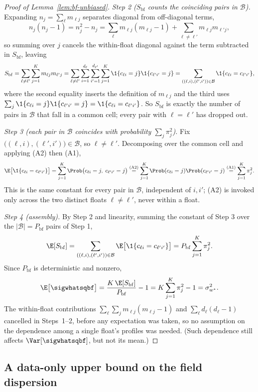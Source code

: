 {\begin{proof}[Proof of Lemma~\ref{lem:bf-unbiased}]
\emph{Step 2 ($S_{\mathrm{bf}}$ counts the coinciding pairs in $\mathcal B$).}
Expanding $n_j=\sum_\ell m_{\ell j}$ separates diagonal from off-diagonal
terms,
\[
  n_j(n_j-1)=n_j^2-n_j
  =\sum_\ell m_{\ell j}(m_{\ell j}-1)+\sum_{\ell\ne\ell'}m_{\ell j}m_{\ell'j},
\]
so summing over $j$ cancels the within-float diagonal against the term
subtracted in $S_{\mathrm{bf}}$, leaving
\[
  S_{\mathrm{bf}}=\sum_{\ell\ne\ell'}\sum_{j=1}^{K}m_{\ell j}m_{\ell'j}
  =\sum_{\ell\ne\ell'}\sum_{i=1}^{d_\ell}\sum_{i'=1}^{d_{\ell'}}
    \sum_{j=1}^{K}\1\{c_{\ell i}=j\}\1\{c_{\ell'i'}=j\}
  =\sum_{((\ell,i),(\ell',i'))\in\mathcal B}\1\{c_{\ell i}=c_{\ell'i'}\},
\]
where the second equality inserts the definition of $m_{\ell j}$ and the
third uses
$\sum_j\1\{c_{\ell i}=j\}\1\{c_{\ell'i'}=j\}=\1\{c_{\ell i}=c_{\ell'i'}\}$. So
$S_{\mathrm{bf}}$ is exactly the number of pairs in $\mathcal B$ that fall
in a common cell; every pair with $\ell=\ell'$ has dropped out.

\emph{Step 3 (each pair in $\mathcal B$ coincides with probability
$\sum_j\pi_j^2$).}
Fix $\bigl((\ell,i),(\ell',i')\bigr)\in\mathcal B$, so $\ell\ne\ell'$.
Decomposing over the common cell and applying (A2) then (A1),
\[
  \E\bigl[\1\{c_{\ell i}=c_{\ell'i'}\}\bigr]
  =\sum_{j=1}^{K}\Prob\bigl(c_{\ell i}=j,\;c_{\ell'i'}=j\bigr)
  \overset{\text{(A2)}}{=}\sum_{j=1}^{K}\Prob(c_{\ell i}=j)\Prob(c_{\ell'i'}=j)
  \overset{\text{(A1)}}{=}\sum_{j=1}^{K}\pi_j^{2}.
\]
This is the same constant for every pair in $\mathcal B$, independent of
$i,i'$; (A2) is invoked only across the two distinct floats $\ell\ne\ell'$,
never within a float.

\emph{Step 4 (assembly).}
By Step 2 and linearity, summing the constant of Step 3 over the
$|\mathcal B|=P_{\mathrm{bf}}$ pairs of Step 1,
\[
  \E[S_{\mathrm{bf}}]
  =\sum_{((\ell,i),(\ell',i'))\in\mathcal B}
     \E\bigl[\1\{c_{\ell i}=c_{\ell'i'}\}\bigr]
  =P_{\mathrm{bf}}\sum_{j=1}^{K}\pi_j^{2}.
\]
Since $P_{\mathrm{bf}}$ is deterministic and nonzero,
\[
  \E\bigl[\sigwhatsqbf\bigr]
  =\frac{K\,\E[S_{\mathrm{bf}}]}{P_{\mathrm{bf}}}-1
  =K\sum_{j=1}^{K}\pi_j^{2}-1
  =\sigma_{w^{\star}}^{2}.
\]
The within-float contributions $\sum_\ell\sum_j m_{\ell j}(m_{\ell j}-1)$ and
$\sum_\ell d_\ell(d_\ell-1)$ cancelled in Steps~1--2, before any expectation was
taken, so no assumption on the dependence among a single float's profiles
was needed. (Such dependence still affects $\Var[\sigwhatsqbf]$, but not
its mean.)
\end{proof}%
}

\subsection{A data-only upper bound on the field dispersion}
\label{sec:sigmaY-bound}

